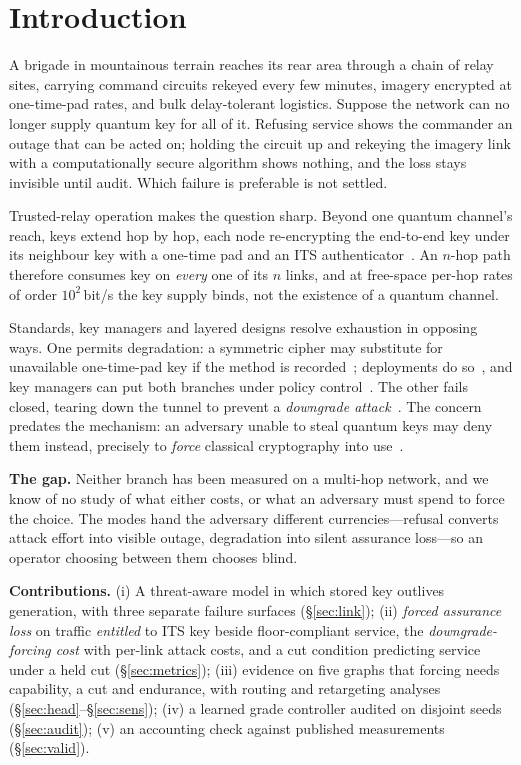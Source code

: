 \documentclass[conference,a4paper]{IEEEtran}
\begin{document}
\section{Introduction}
A brigade in mountainous terrain reaches its rear area through a chain of relay
sites, carrying command circuits rekeyed every few minutes, imagery encrypted at
one-time-pad rates, and bulk delay-tolerant logistics. Suppose the network can no
longer supply quantum key for all of it. Refusing service shows the commander an
outage that can be acted on; holding the circuit up and rekeying the imagery link
with a computationally secure algorithm shows nothing, and the loss stays invisible
until audit. Which failure is preferable is not settled.

Trusted-relay operation makes the question sharp. Beyond one quantum channel's
reach, keys extend hop by hop, each node re-encrypting the end-to-end key under its
neighbour key with a one-time pad and an ITS authenticator~\cite{salvail}. An
$n$-hop path therefore consumes key on \emph{every} one of its $n$ links, and at
free-space per-hop rates of order $10^{2}$\,bit/s the key supply binds, not the
existence of a quantum channel.

Standards, key managers and layered designs resolve exhaustion in opposing ways. One
permits degradation: a symmetric cipher may substitute for unavailable one-time-pad
key if the method is recorded~\cite{itu3803}; deployments do so~\cite{makris}, and
key managers can put both branches under policy control~\cite{tysowski}. The other
fails closed, tearing down the tunnel to prevent a \emph{downgrade
attack}~\cite{spooren}. The concern predates the mechanism: an adversary unable to
steal quantum keys may deny them instead, precisely to \emph{force} classical
cryptography into use~\cite{schartner}.

\textbf{The gap.} Neither branch has been measured on a multi-hop network, and we
know of no study of what either costs, or what an adversary must spend to force the
choice. The modes hand the adversary different currencies---refusal converts attack
effort into visible outage, degradation into silent assurance loss---so an operator
choosing between them chooses blind.

\textbf{Contributions.} (i) A threat-aware model in which stored key outlives
generation, with three separate failure surfaces (\S\ref{sec:link}); (ii)
\emph{forced assurance loss} on traffic \emph{entitled} to ITS key beside
floor-compliant service, the \emph{downgrade-forcing cost} with per-link attack
costs, and a cut condition predicting service under a held cut
(\S\ref{sec:metrics}); (iii) evidence on five graphs that forcing needs capability, a
cut and endurance, with routing and retargeting analyses
(\S\ref{sec:head}--\S\ref{sec:sens}); (iv) a learned grade controller audited on
disjoint seeds (\S\ref{sec:audit}); (v) an accounting check against published
measurements (\S\ref{sec:valid}).
\end{document}
